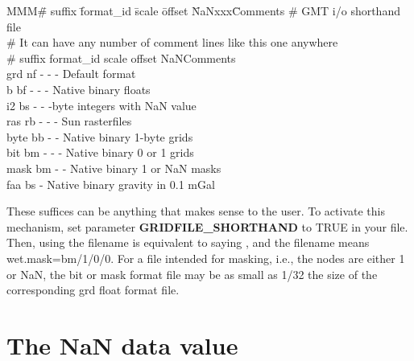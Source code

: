 \noindent
\begin{tabbing}
MMM\=\# suffix \=format\_id \=scale \=offset \=NaNxxx\=Comments \kill 
\>\# GMT i/o shorthand file \\ 
\>\# It can have any number of comment lines like this one anywhere \\
\>\# suffix \> format\_id	\> scale \> offset \>NaN\>Comments \\ 
\>grd \> nf \> - \> - \> - \>Default format \\ 
\>b \> bf \> - \> - \> - \> Native binary floats \\ 
\>i2 \> bs \> - \> -  -byte integers with NaN value \\ 
\>ras \> rb \> - \> - \> - \> Sun rasterfiles \\ 
\>byte \> bb \> - \> -  \> Native binary 1-byte grids \\ 
\>bit \> bm \> - \> - \> - \> Native binary 0 or 1 grids \\ 
\>mask \> bm \> - \> -  \> Native binary 1 or NaN masks \\ 
\>faa \> bs  \> -  \> Native binary gravity in 0.1 mGal
\end{tabbing} 

These suffices can be anything that makes sense to the user.  To
activate this mechanism, set parameter {\bf GRIDFILE\_SHORTHAND} to TRUE in
your  file.  Then, using the filename
 is equivalent to saying ,
and the filename  means wet.mask=bm/1/0/0.  For a
file intended for masking, i.e., the nodes are either 1 or NaN,
the bit or mask format file may be as small as 1/32 the size of the
corresponding grd float format file. 

\section{The NaN data value}

